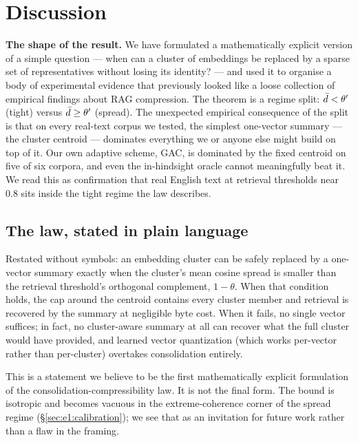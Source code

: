 \section{Discussion}
\label{sec:discussion}

\begin{intuition}
\textbf{The shape of the result.} We have formulated a mathematically
explicit version of a simple question --- when can a cluster of
embeddings be replaced by a sparse set of representatives without
losing its identity? --- and used it to organise a body of
experimental evidence that previously looked like a loose collection
of empirical findings about RAG compression. The theorem is a
regime split: $\bar{d} < \theta'$ (tight) versus $\bar{d} \geq \theta'$
(spread). The unexpected empirical consequence of the split is that
on every real-text corpus we tested, the simplest one-vector
summary --- the cluster centroid --- dominates everything we or
anyone else might build on top of it. Our own adaptive scheme, GAC,
is dominated by the fixed centroid on five of six corpora, and even
the in-hindsight oracle cannot meaningfully beat it. We read this
as confirmation that real English text at retrieval thresholds near
$0.8$ sits inside the tight regime the law describes.
\end{intuition}

\subsection{The law, stated in plain language}
\label{sec:disc:law}

Restated without symbols: an embedding cluster can be safely
replaced by a one-vector summary exactly when the cluster's mean
cosine spread is smaller than the retrieval threshold's orthogonal
complement, $1 - \theta$. When that condition holds, the cap around
the centroid contains every cluster member and retrieval is
recovered by the summary at negligible byte cost. When it fails, no
single vector suffices; in fact, no cluster-aware summary at all
can recover what the full cluster would have provided, and learned
vector quantization (which works per-vector rather than per-cluster)
overtakes consolidation entirely.

This is a statement we believe to be the first mathematically
explicit formulation of the consolidation-compressibility law. It is
not the final form. The bound is isotropic and becomes vacuous in
the extreme-coherence corner of the spread regime
(\S\ref{sec:e1:calibration}); we see that as an invitation for
future work rather than a flaw in the framing.

